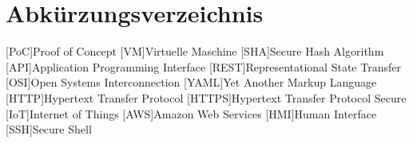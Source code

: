 \documentclass[12pt,oneside]{report}
\begin{document}
  
  
  
  
  
  
  
  

  \chapter*{Abkürzungsverzeichnis}
  \begin{acronym}
    [PoC]{Proof of Concept}
    [VM]{Virtuelle Maschine}
    [SHA]{Secure Hash Algorithm}
    [API]{Application Programming Interface}
    [REST]{Representational State Transfer}
    [OSI]{Open Systems Interconnection}
    [YAML]{Yet Another Markup Language}
    [HTTP]{Hypertext Transfer Protocol}
    [HTTPS]{Hypertext Transfer Protocol Secure}
    [IoT]{Internet of Things}
    [AWS]{Amazon Web Services}
    [HMI]{Human Interface}
    [SSH]{Secure Shell}

  \end{acronym}

  \newpage


  \newpage

  
  
  



  \listoffigures
  \newpage

  \listoftables
  \newpage

  
\end{document}
